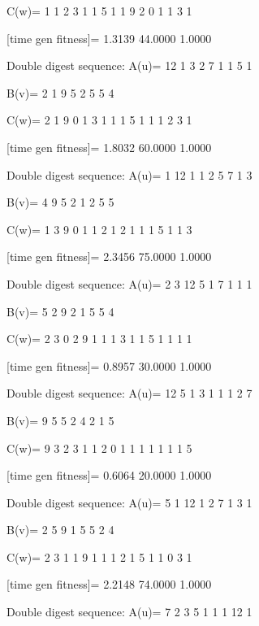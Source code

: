 C(w)=
     1     1     2     3     1     1     5     1     1     9     2     0     1     1     3     1

[time gen fitness]=
    1.3139   44.0000    1.0000

Double digest sequence:
A(u)=
    12     1     3     2     7     1     1     5     1

B(v)=
     2     1     9     5     2     5     5     4

C(w)=
     2     1     9     0     1     3     1     1     1     5     1     1     1     2     3     1

[time gen fitness]=
    1.8032   60.0000    1.0000

Double digest sequence:
A(u)=
     1    12     1     1     2     5     7     1     3

B(v)=
     4     9     5     2     1     2     5     5

C(w)=
     1     3     9     0     1     1     2     1     2     1     1     1     5     1     1     3

[time gen fitness]=
    2.3456   75.0000    1.0000

Double digest sequence:
A(u)=
     2     3    12     5     1     7     1     1     1

B(v)=
     5     2     9     2     1     5     5     4

C(w)=
     2     3     0     2     9     1     1     1     3     1     1     5     1     1     1     1

[time gen fitness]=
    0.8957   30.0000    1.0000

Double digest sequence:
A(u)=
    12     5     1     3     1     1     1     2     7

B(v)=
     9     5     5     2     4     2     1     5

C(w)=
     9     3     2     3     1     1     2     0     1     1     1     1     1     1     1     5

[time gen fitness]=
    0.6064   20.0000    1.0000

Double digest sequence:
A(u)=
     5     1    12     1     2     7     1     3     1

B(v)=
     2     5     9     1     5     5     2     4

C(w)=
     2     3     1     1     9     1     1     1     2     1     5     1     1     0     3     1

[time gen fitness]=
    2.2148   74.0000    1.0000

Double digest sequence:
A(u)=
     7     2     3     5     1     1     1    12     1

